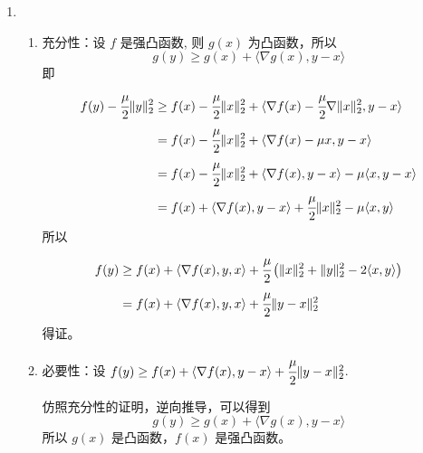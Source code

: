 \documentclass[11pt,letter,notitlepage]{article}
\begin{document}
\begin{solution}
    \begin{enumerate}
        \item \begin{enumerate}
                  令 $g(x)=f(x)-\cfrac{\mu}{2}\|x\|_2^2$
                  \item 充分性：设 $f$ 是强凸函数, 则 $g(x)$ 为凸函数，所以
                        $$g(y)\ge g(x)+\langle \nabla g(x),y-x \rangle$$
                        即
                        $$\begin{aligned}
                                f(y)-\cfrac{\mu}{2}\|y\|_2^2
                                 & \ge f(x)-\cfrac{\mu}{2}\|x\|_2^2
                                + \langle \nabla f(x)-\cfrac{\mu}{2}\nabla \|x\|_2^2,y-x \rangle \\
                                 & = f(x)-\cfrac{\mu}{2}\|x\|_2^2
                                + \langle \nabla f(x)-\mu x,y-x \rangle                          \\
                                 & = f(x)-\cfrac{\mu}{2}\|x\|_2^2
                                + \langle \nabla f(x),y-x \rangle -\mu\langle x,y-x \rangle      \\
                                 & = f(x)+\langle \nabla f(x),y-x \rangle
                                +\cfrac{\mu}{2}\|x\|_2^2 - \mu \langle x,y \rangle
                            \end{aligned}$$
                        所以
                        $$\begin{aligned}
                                f(y)
                                 & \ge f(x)+\langle \nabla f(x),y,x \rangle
                                +\cfrac{\mu}{2}\left( \|x\|_2^2 + \|y\|_2^2 -2\langle x,y \rangle \right) \\
                                 & = f(x)+\langle \nabla f(x),y,x \rangle
                                + \cfrac{\mu}{2} \|y-x\|_2^2
                            \end{aligned}$$
                        得证。

                  \item 必要性：设 $ f(y)\ge f(x)+\langle\nabla f(x),y-x\rangle+\cfrac{\mu}{2}\|y-x\|_2^2$.

                        仿照充分性的证明，逆向推导，可以得到
                        $$g(y)\ge g(x)+\langle \nabla g(x),y-x \rangle$$
                        所以 $g(x)$ 是凸函数，$f(x)$ 是强凸函数。


\end{enumerate}
\end{enumerate}
\end{solution}
\end{document}
